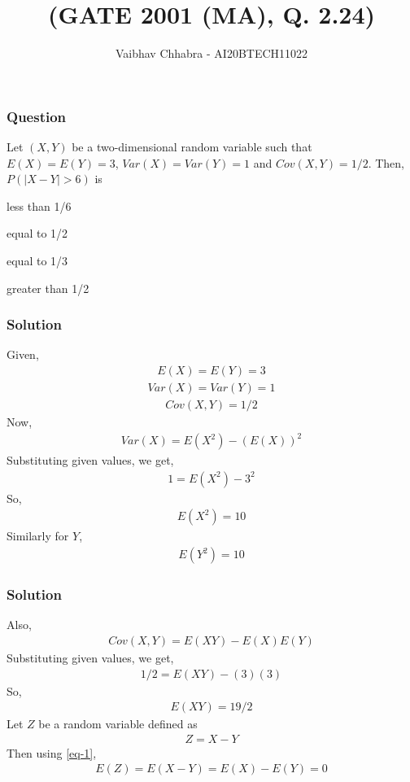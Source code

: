 \documentclass{beamer}
\title{(GATE 2001 (MA), Q. 2.24)}
\author{Vaibhav Chhabra - AI20BTECH11022}
\date{}
\begin{document}
\begin{frame}
\titlepage
\end{frame}
\begin{frame}
\frametitle{Question}
\begin{block}{}
Let $(X,Y)$ be a two-dimensional random variable such that $E(X)=E(Y)=3$, $Var(X)=Var(Y)=1$ and $Cov(X,Y)=1/2$.
Then, $P(|X-Y|>6)$ is
\begin{enumerate}
\begin{multicols}{2}
    \item less than 1/6
    \item equal to 1/2
    \item equal to 1/3
    \item greater than 1/2
\end{multicols}
\end{enumerate}
\end{block}
\end{frame}

\begin{frame}
\frametitle{Solution}
Given,
\begin{align} \label{eq-1}
    E(X)=E(Y)=3
\end{align}
\begin{align}
    Var(X)=Var(Y)=1
\end{align}
\begin{align}
    Cov(X,Y)=1/2
\end{align}
Now,
\begin{align}
    Var(X)=E(X^2)-(E(X))^2
\end{align}
Substituting given values, we get,
\begin{align}
    1=E(X^2)-3^2
\end{align}
So,
\begin{align} \label{eq-2}
    E(X^2)=10
\end{align}
Similarly for $Y$,
\begin{align} \label{eq-3}
    E(Y^2)=10
\end{align}
\end{frame}
\begin{frame}
\frametitle{Solution}
Also,
\begin{align}
    Cov(X,Y)=E(XY)-E(X)E(Y)
\end{align}
Substituting given values, we get,
\begin{align}
    1/2=E(XY)-(3)(3)
\end{align}
So,
\begin{align} \label{eq-4}
    E(XY)=19/2
\end{align}
Let $Z$ be a random variable defined as
\begin{align} \label{eq-5}
    Z=X-Y
\end{align}
Then using \eqref{eq-1},
\begin{align} \label{eq-6}
    E(Z)=E(X-Y)=E(X)-E(Y)=0
\end{align}
\end{frame}
\end{document}
